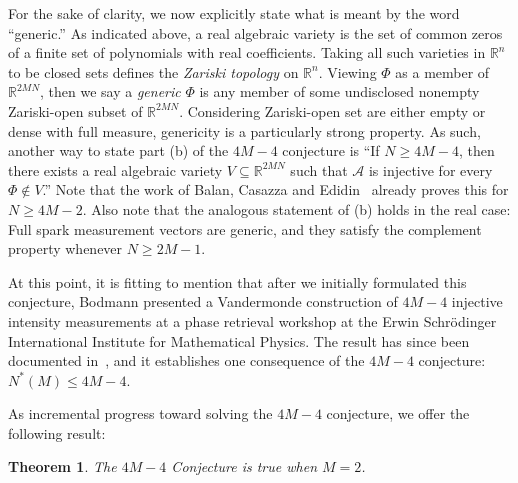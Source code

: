 \documentclass[times,10pt]{elsarticle}
\theoremstyle{plain}
\newtheorem{theorem}{Theorem}
\begin{document}
For the sake of clarity, we now explicitly state what is meant by the word ``generic.''
As indicated above, a real algebraic variety is the set of common zeros of a finite set of polynomials with real coefficients.
Taking all such varieties in $\mathbb{R}^n$ to be closed sets defines the \textit{Zariski topology} on $\mathbb{R}^n$.
Viewing $\Phi$ as a member of $\mathbb{R}^{2MN}$, then we say a \textit{generic} $\Phi$ is any member of some undisclosed nonempty Zariski-open subset of $\mathbb{R}^{2MN}$.
Considering Zariski-open set are either empty or dense with full measure, genericity is a particularly strong property.
As such, another way to state part (b) of the $4M-4$ conjecture is ``If $N\geq4M-4$, then there exists a real algebraic variety $V\subseteq\mathbb{R}^{2MN}$ such that $\mathcal{A}$ is injective for every $\Phi\not\in V$.''
Note that the work of Balan, Casazza and Edidin~\cite{BalanCE:06} already proves this for $N\geq 4M-2$.
Also note that the analogous statement of (b) holds in the real case:
Full spark measurement vectors are generic, and they satisfy the complement property whenever $N\geq 2M-1$.

At this point, it is fitting to mention that after we initially formulated this conjecture, Bodmann presented a Vandermonde construction of $4M-4$ injective intensity measurements at a phase retrieval workshop at the Erwin Schr\"{o}dinger International Institute for Mathematical Physics.
The result has since been documented in~\cite{BodmannH:12}, and it establishes one consequence of the $4M-4$ conjecture: $N^*(M)\leq 4M-4$.

As incremental progress toward solving the $4M-4$ conjecture, we offer the following result:

\begin{theorem}
\label{thm.4M4 true 2}
The $4M-4$ Conjecture is true when $M=2$.
\end{theorem}
\end{document}
